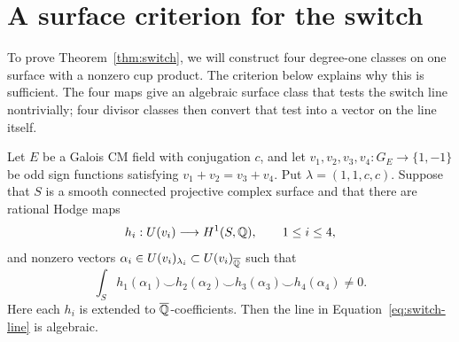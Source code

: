 \section{A surface criterion for the switch}\label{sec:surface}

To prove Theorem~\ref{thm:switch}, we will construct four degree-one
classes on one surface with a nonzero cup product.  The criterion
below explains why this is sufficient.  The four maps give an
algebraic surface class that tests the switch line nontrivially; four
divisor classes then convert that test into a vector on the line
itself.

\begin{proposition}\label{prop:surface-switch}
Let \(E\) be a Galois CM field with conjugation \(c\), and let
\(v_1,v_2,v_3,v_4:G_E\to\{1,-1\}\) be odd sign functions satisfying
\(v_1+v_2=v_3+v_4\).  Put \(\lambda=(1,1,c,c)\).
Suppose that \(S\) is a smooth connected projective complex surface
and that there are rational Hodge maps
\[
 h_i:U(v_i)\longrightarrow H^1(S,\mathbb{Q}),\qquad 1\leq i\leq4,
\]
and nonzero vectors
\(\alpha_i\in U(v_i)_{\lambda_i}\subset U(v_i)_{\overline{\mathbb{Q}}}\) such that
\begin{equation}\label{eq:surface-period}
 \int_S h_1(\alpha_1)\smile h_2(\alpha_2)
             \smile h_3(\alpha_3)\smile h_4(\alpha_4)\ne0.
\end{equation}
Here each \(h_i\) is extended to \(\overline{\mathbb{Q}}\)-coefficients.  Then the
line in Equation~\eqref{eq:switch-line} is algebraic.
\end{proposition}

